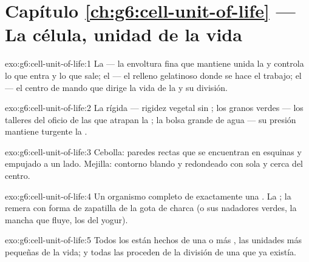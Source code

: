 \section*{Capítulo \ref{ch:g6:cell-unit-of-life} --- La célula, unidad de la vida}

\begin{solution}{exo:g6:cell-unit-of-life:1}
La  --- la envoltura fina que mantiene unida la  y
controla lo que entra y lo que sale; el  --- el relleno
gelatinoso donde se hace el trabajo; el  --- el centro de mando
que dirige la vida de la  y su división.
\end{solution}

\begin{solution}{exo:g6:cell-unit-of-life:2}
La  rígida --- rigidez vegetal sin ; los granos
verdes --- los talleres del oficio de las  que atrapan la
; la bolsa grande de agua --- su presión mantiene turgente la .
\end{solution}

\begin{solution}{exo:g6:cell-unit-of-life:3}
Cebolla: paredes rectas que se encuentran en esquinas y  empujado
a un lado. Mejilla: contorno blando y redondeado con  sola y
 cerca del centro.
\end{solution}

\begin{solution}{exo:g6:cell-unit-of-life:4}
Un organismo completo de exactamente una . La ; la remera
con forma de zapatilla de la gota de charca (o sus nadadores verdes, la
mancha que fluye, los  del yogur).
\end{solution}

\begin{solution}{exo:g6:cell-unit-of-life:5}
Todos los  están hechos de una o más , las unidades
más pequeñas de la vida; y todas las  proceden de la división de
una  que ya existía.
\end{solution}

